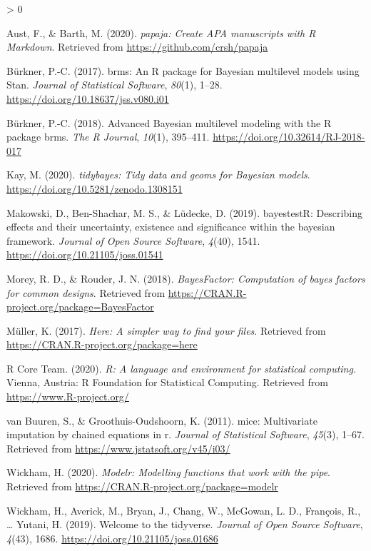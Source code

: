 \documentclass[
  english,
  man,floatsintext]{apa6}
\newlength{\cslhangindent}
\newenvironment{CSLReferences}[2] %
 {%
  \setlength{\parindent}{0pt}
  \ifodd #1 \everypar{\setlength{\hangindent}{\cslhangindent}}\ignorespaces\fi
  \ifnum #2 > 0
  \setlength{\parskip}{#2\baselineskip}
  \fi
 }%
 {}
\begin{document}
\hypertarget{refs}{}
\begin{CSLReferences}{1}{0}
\leavevmode\hypertarget{ref-R-papaja}{}%
Aust, F., \& Barth, M. (2020). \emph{{papaja}: {Create} {APA} manuscripts with {R Markdown}}. Retrieved from \url{https://github.com/crsh/papaja}

\leavevmode\hypertarget{ref-R-brms_a}{}%
Bürkner, P.-C. (2017). {brms}: An {R} package for {Bayesian} multilevel models using {Stan}. \emph{Journal of Statistical Software}, \emph{80}(1), 1--28. \url{https://doi.org/10.18637/jss.v080.i01}

\leavevmode\hypertarget{ref-R-brms_b}{}%
Bürkner, P.-C. (2018). Advanced {Bayesian} multilevel modeling with the {R} package {brms}. \emph{The R Journal}, \emph{10}(1), 395--411. \url{https://doi.org/10.32614/RJ-2018-017}

\leavevmode\hypertarget{ref-R-tidybayes}{}%
Kay, M. (2020). \emph{{tidybayes}: Tidy data and geoms for {Bayesian} models}. \url{https://doi.org/10.5281/zenodo.1308151}

\leavevmode\hypertarget{ref-R-bayestestR}{}%
Makowski, D., Ben-Shachar, M. S., \& Lüdecke, D. (2019). bayestestR: Describing effects and their uncertainty, existence and significance within the bayesian framework. \emph{Journal of Open Source Software}, \emph{4}(40), 1541. \url{https://doi.org/10.21105/joss.01541}

\leavevmode\hypertarget{ref-R-BayesFactor}{}%
Morey, R. D., \& Rouder, J. N. (2018). \emph{BayesFactor: Computation of bayes factors for common designs}. Retrieved from \url{https://CRAN.R-project.org/package=BayesFactor}

\leavevmode\hypertarget{ref-R-here}{}%
Müller, K. (2017). \emph{Here: A simpler way to find your files}. Retrieved from \url{https://CRAN.R-project.org/package=here}

\leavevmode\hypertarget{ref-R-base}{}%
R Core Team. (2020). \emph{R: A language and environment for statistical computing}. Vienna, Austria: R Foundation for Statistical Computing. Retrieved from \url{https://www.R-project.org/}

\leavevmode\hypertarget{ref-R-mice}{}%
van Buuren, S., \& Groothuis-Oudshoorn, K. (2011). {mice}: Multivariate imputation by chained equations in r. \emph{Journal of Statistical Software}, \emph{45}(3), 1--67. Retrieved from \url{https://www.jstatsoft.org/v45/i03/}

\leavevmode\hypertarget{ref-R-modelr}{}%
Wickham, H. (2020). \emph{Modelr: Modelling functions that work with the pipe}. Retrieved from \url{https://CRAN.R-project.org/package=modelr}

\leavevmode\hypertarget{ref-R-tidyverse}{}%
Wickham, H., Averick, M., Bryan, J., Chang, W., McGowan, L. D., François, R., \ldots{} Yutani, H. (2019). Welcome to the {tidyverse}. \emph{Journal of Open Source Software}, \emph{4}(43), 1686. \url{https://doi.org/10.21105/joss.01686}

\end{CSLReferences}

\endgroup
\end{document}
